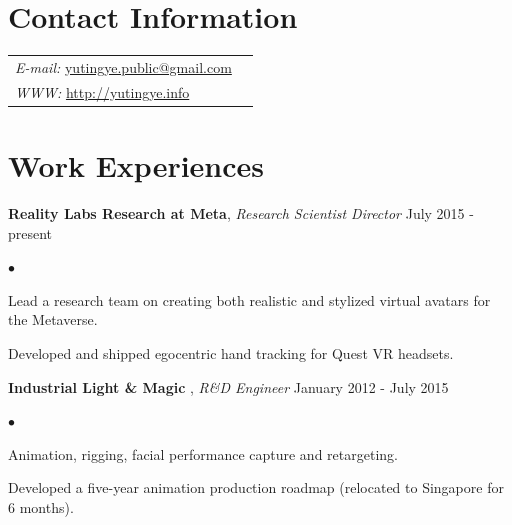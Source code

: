 \documentclass[margin,line]{res}
\newenvironment{list2}{
  \begin{list}{$\bullet$}{%
      \setlength{\itemsep}{0in}
      \setlength{\parsep}{0in} \setlength{\parskip}{0in}
      \setlength{\topsep}{0in} \setlength{\partopsep}{0in} 
      \setlength{\leftmargin}{0.2in}}}{\end{list}}
\begin{document}

\begin{resume}
\section{\sc Contact Information}
\vspace{.05in}
\begin{tabular}{@{}p{3in}p{3in}}
{\it E-mail:}    \href{mailto:yutingye.public@gmail.com}{yutingye.public@gmail.com} \\
{\it WWW:}  \href{http://yutingye.info}{http://yutingye.info} \\ 
\end{tabular}

\section{\sc Work Experiences}
{\bf Reality Labs Research at Meta}, {\em Research Scientist Director}  \hfill July 2015 - present \\
\begin{list2}
\vspace*{-.15in}
\item Lead a research team on creating both realistic and stylized virtual avatars for the Metaverse.
\item Developed and shipped egocentric hand tracking for Quest VR headsets.
\end{list2}

{\bf Industrial Light \& Magic} , {\em R\&D Engineer} \hfill January 2012 - July 2015 \\
\begin{list2}
\vspace*{-.15in}
\item Animation, rigging,  facial performance capture and retargeting.
\item Developed a five-year animation production roadmap (relocated to Singapore for 6 months).
\end{list2}




\end{resume}
\end{document}
